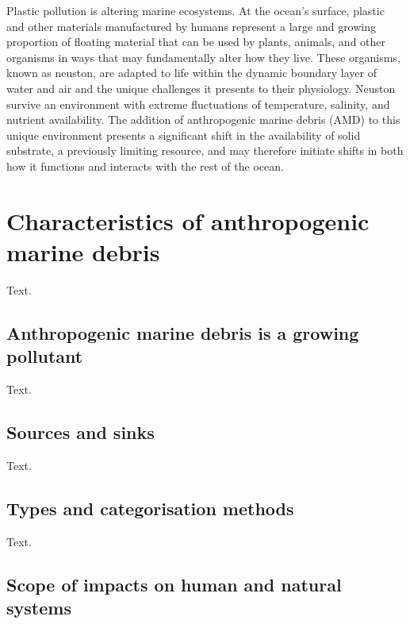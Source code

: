 \documentclass[a4paper, nobind]{templates/ociamthesis}
\begin{document}
Plastic pollution is altering marine ecosystems. At the ocean's surface, plastic and other materials manufactured by humans represent a large and growing proportion of floating material \autocite{Koelmans2017} that can be used by plants, animals, and other organisms in ways that may fundamentally alter how they live. These organisms, known as neuston, are adapted to life within the dynamic boundary layer of water and air and the unique challenges it presents to their physiology. Neuston survive an environment with extreme fluctuations of temperature, salinity, and nutrient availability. The addition of anthropogenic marine debris (AMD) to this unique environment presents a significant shift in the availability of solid substrate, a previously limiting resource, and may therefore initiate shifts in both how it functions and interacts with the rest of the ocean.

\hypertarget{characteristics-of-anthropogenic-marine-debris}{%
\section{Characteristics of anthropogenic marine debris}\label{characteristics-of-anthropogenic-marine-debris}}

Text.

\hypertarget{anthropogenic-marine-debris-is-a-growing-pollutant}{%
\subsection{Anthropogenic marine debris is a growing pollutant}\label{anthropogenic-marine-debris-is-a-growing-pollutant}}

Text.

\hypertarget{sources-and-sinks}{%
\subsection{Sources and sinks}\label{sources-and-sinks}}

Text.

\hypertarget{types-and-categorisation-methods}{%
\subsection{Types and categorisation methods}\label{types-and-categorisation-methods}}

Text.

\hypertarget{scope-of-impacts-on-human-and-natural-systems}{%
\subsection{Scope of impacts on human and natural systems}\label{scope-of-impacts-on-human-and-natural-systems}}
\end{document}
